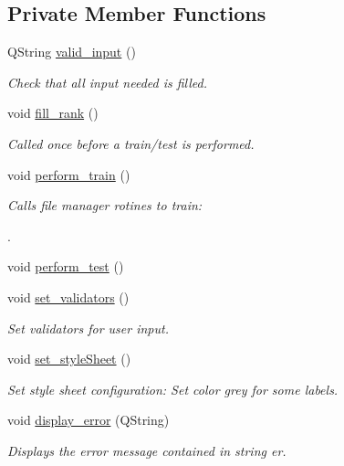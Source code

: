 \subsection*{Private Member Functions}
\begin{DoxyCompactItemize}
\item 
Q\-String \hyperlink{a00002_a5ec9d8a051303b218c4542f96a87b56f}{valid\-\_\-input} ()
\begin{DoxyCompactList}\small\item\em Check that all input needed is filled. \end{DoxyCompactList}\item 
void \hyperlink{a00002_a8e8c5918a3a0ddfd352c62e7348d3d74}{fill\-\_\-rank} ()
\begin{DoxyCompactList}\small\item\em Called once before a train/test is performed. \end{DoxyCompactList}\item 
void \hyperlink{a00002_ad1bb069dee02010a61045c91f5e7752f}{perform\-\_\-train} ()
\begin{DoxyCompactList}\small\item\em Calls file manager rotines to train\-:\par
. \end{DoxyCompactList}\item 
void \hyperlink{a00002_ade6ba53055965b3522fa3cd022e4c5e0}{perform\-\_\-test} ()
\item 
void \hyperlink{a00002_abd9fac4d8ad5334cc48afb0513544898}{set\-\_\-validators} ()
\begin{DoxyCompactList}\small\item\em Set validators for user input. \end{DoxyCompactList}\item 
void \hyperlink{a00002_a5683a1862ec1a85cf87d9c5f6fc528e9}{set\-\_\-style\-Sheet} ()
\begin{DoxyCompactList}\small\item\em Set style sheet configuration\-: Set color grey for some labels. \end{DoxyCompactList}\item 
void \hyperlink{a00002_a69ac504cf1500a8c6283d8721b09aeb2}{display\-\_\-error} (Q\-String)
\begin{DoxyCompactList}\small\item\em Displays the error message contained in string er. \end{DoxyCompactList}\end{DoxyCompactItemize}
